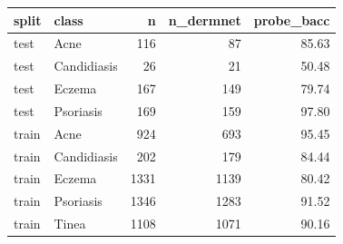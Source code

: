 \begin{tabular}{llrrr}
\toprule
split & class & n & n\_dermnet & probe\_bacc \\
\midrule
test & Acne & 116 & 87 & 85.63 \\
test & Candidiasis & 26 & 21 & 50.48 \\
test & Eczema & 167 & 149 & 79.74 \\
test & Psoriasis & 169 & 159 & 97.80 \\
train & Acne & 924 & 693 & 95.45 \\
train & Candidiasis & 202 & 179 & 84.44 \\
train & Eczema & 1331 & 1139 & 80.42 \\
train & Psoriasis & 1346 & 1283 & 91.52 \\
train & Tinea & 1108 & 1071 & 90.16 \\
\bottomrule
\end{tabular}
